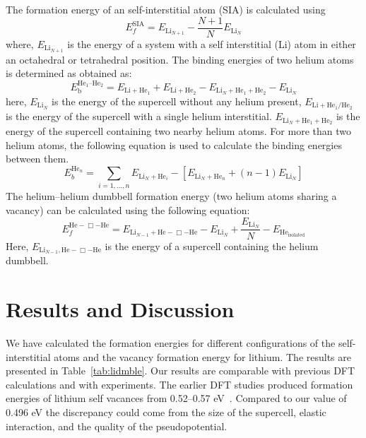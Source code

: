 The formation energy of an self-interstitial atom (SIA) is calculated using
\begin{equation}
E_f^{\text{SIA}} = E_{\text{Li}_{N+1}} - \frac{N+1}{N} E_{\text{Li}_N}
\end{equation}
where, $E_{\text{Li}_{N+1}}$ is the energy of a system with a self interstitial (Li) atom in either an octahedral or tetrahedral position.
The binding energies of two helium atoms is determined as obtained as: 
\begin{equation}
E_{\text{b}}^{\text{He}_1\text{--}\text{He}_2} = E_{\text{Li}+\text{He}_1} + E_{\text{Li}+\text{He}_2} - E_{\text{Li}_N+\text{He}_1 + \text{He}_2} - E_{\text{Li}_N} 
\end{equation}
here, $E_{\text{Li}_N}$ is the energy of the supercell without any helium present, $E_{\text{Li}+\text{He}_1/\text{He}_2}$ is the energy of the supercell with a single helium interstitial.  $E_{\text{Li}_N+\text{He}_1 + \text{He}_2}$ is the energy of the supercell containing two nearby helium atoms. For more than two helium atoms, the following equation is used to calculate the binding energies between them.
\begin{equation}
E_b^{\text{He}_n} = \sum_{i=1,\dots,n} E_{\text{Li}_N+\text{He}_i} - \left[ E_{\text{Li}_N+\text{He}_n} + (n-1)E_{\text{Li}_N} \right ]
\end{equation}
The helium--helium dumbbell formation energy (two helium atoms sharing a vacancy) can be calculated using the following equation:
\begin{equation}\label{eq_hedmbl}
E_f^{\text{He}-\Box-\text{He}} = E_{\text{Li}_{N-1}+\text{He}-\Box-\text{He}} - E_{\text{Li}_N} + \frac{E_{\text{Li}_N}}{N} - E_{\text{He}_{\text{isolated}}}
\end{equation}
Here, $E_{\text{Li}_{N-1},\text{He}-\Box-\text{He}}$ is the energy of a supercell containing the helium dumbbell.

\section{Results and Discussion}
We have calculated the formation energies for different configurations of the self-interstitial atoms and the vacancy formation energy for lithium. The results are presented in Table~\ref{tab:lidmble}. Our results are comparable with previous DFT calculations and with experiments. The earlier DFT studies produced formation energies of lithium self vacances from 0.52--0.57 eV~\cite{benedek1992formation, Pawellek_1991, frank1993properties, frank1996first}. Compared to our value of 0.496 eV the discrepancy could come from the size of the supercell, elastic interaction, and the quality of the pseudopotential. 

